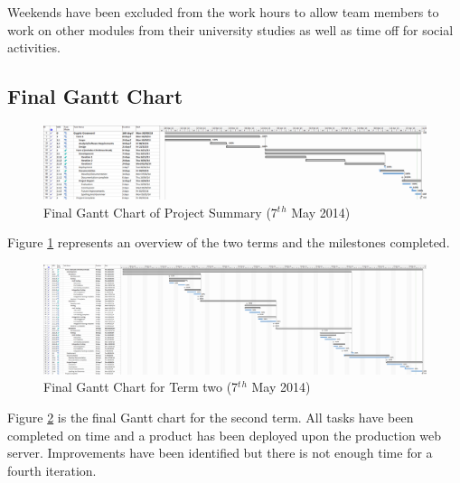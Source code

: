 \begin{landscape}
Weekends have been excluded from the work hours to allow team members to work on
other modules from their university studies as well as time off for social
activities.


\newpage
\subsection{Final Gantt Chart}

\begin{figure}[H]
  \centering
  \includegraphics[width=\linewidth]{images/gant_chart_final_overview.png}
  \caption{Final Gantt Chart of Project Summary (7$^t$$^h$ May 2014)}
  \label{fig:ganttfinaloverview}
\end{figure}

Figure \ref{fig:ganttfinaloverview} represents an overview of the two terms and 
the milestones completed.

\begin{figure}[H]
  \centering
  \includegraphics[width=\linewidth]{images/gant_chart_final_term2.png}
  \caption{Final Gantt Chart for Term two (7$^t$$^h$ May 2014)}
  \label{fig:ganttfinalterm2}
\end{figure}

Figure \ref{fig:ganttfinalterm2} is the final Gantt chart for the second term. 
All tasks have been completed on time and a product has been deployed upon the 
production web server. Improvements have been identified but there is not enough
time for a fourth iteration.

\end{landscape}
